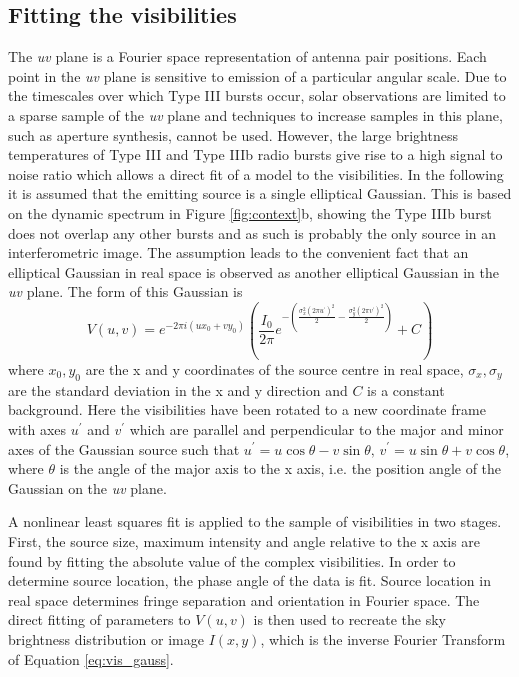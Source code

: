 \subsection{Fitting the visibilities}
\label{sec:vis_fit}
The \textit{uv} plane is a Fourier space representation of antenna pair positions. Each point in the \textit{uv} plane is sensitive to emission of a particular angular scale. Due to the timescales over which Type III bursts occur, solar observations are limited to a sparse sample of the \textit{uv} plane and techniques to increase samples in this plane, such as aperture synthesis, cannot be used. However, the large brightness temperatures of Type III and Type IIIb radio bursts \citep{Reid2014} give rise to a  high signal to noise ratio which allows a direct fit of a model to the visibilities.
In the following it is assumed that the emitting source is a single elliptical Gaussian. This is based on the dynamic spectrum in Figure \ref{fig:context}b, showing the Type IIIb burst does not overlap any other bursts and as such is probably the only source in an interferometric image. The assumption leads to the convenient fact that an elliptical Gaussian in real space is observed as another elliptical Gaussian in the \textit{uv} plane. The form of this Gaussian is
\begin{equation}
V(u,v) = e^{-2\pi i(ux_0+vy_0)} \left( \frac{I_0}{2\pi} e^{-\left(\frac{\sigma_x^2(2\pi u^\prime)^2}{2}-\frac{\sigma_y^2(2\pi v^\prime)^2}{2}\right)} + C \right)
\label{eq:vis_gauss}
\end{equation}
where $x_0, y_0$ are the x and y coordinates of the source centre in real space, $\sigma_x, \sigma_y$ are the standard deviation in the x and y direction and $C$ is a constant background. Here the visibilities have been rotated to a new coordinate frame with axes $u^\prime$ and $v^\prime$ which are parallel and perpendicular to the major and minor axes of the Gaussian source such that $u^\prime = u\cos{\theta} - v\sin{\theta} \mbox{, } v^\prime = u\sin{\theta} + v\cos{\theta}$,  where $\theta$ is the angle of the major axis to the x axis, i.e. the position angle of the Gaussian on the \textit{uv} plane.

A nonlinear least squares fit is applied to the sample of visibilities in two stages. First, the source size, maximum intensity and angle relative to the x axis are found by fitting the absolute value of the complex visibilities.
In order to determine source location, the phase angle of the data is fit. Source location in real space determines fringe separation and orientation in Fourier space. The direct fitting of parameters to \textbf{$V(u,v)$} is then used to recreate the sky brightness distribution or image \textbf{$I(x,y)$}, which is the inverse Fourier Transform of Equation \ref{eq:vis_gauss}.


